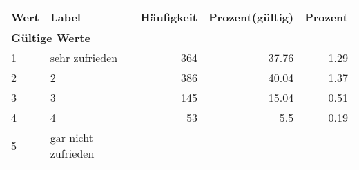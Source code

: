      \begin{longtable}{lXrrr}
     \toprule
     \textbf{Wert} & \textbf{Label} & \textbf{Häufigkeit} & \textbf{Prozent(gültig)} & \textbf{Prozent} \\
     \endhead
     \midrule
     \multicolumn{5}{l}{\textbf{Gültige Werte}}\\

     1 &
     \multicolumn{1}{X}{ sehr zufrieden   } &


       \num{364} &
       \num[round-mode=places,round-precision=2]{37.76} &
         \num[round-mode=places,round-precision=2]{1.29} \\

     2 &
     \multicolumn{1}{X}{ 2   } &


       \num{386} &
       \num[round-mode=places,round-precision=2]{40.04} &
         \num[round-mode=places,round-precision=2]{1.37} \\

     3 &
     \multicolumn{1}{X}{ 3   } &


       \num{145} &
       \num[round-mode=places,round-precision=2]{15.04} &
         \num[round-mode=places,round-precision=2]{0.51} \\

     4 &
     \multicolumn{1}{X}{ 4   } &


       \num{53} &
       \num[round-mode=places,round-precision=2]{5.5} &
         \num[round-mode=places,round-precision=2]{0.19} \\

     5 &
     \multicolumn{1}{X}{ gar nicht zufrieden   } &



\end{longtable}
